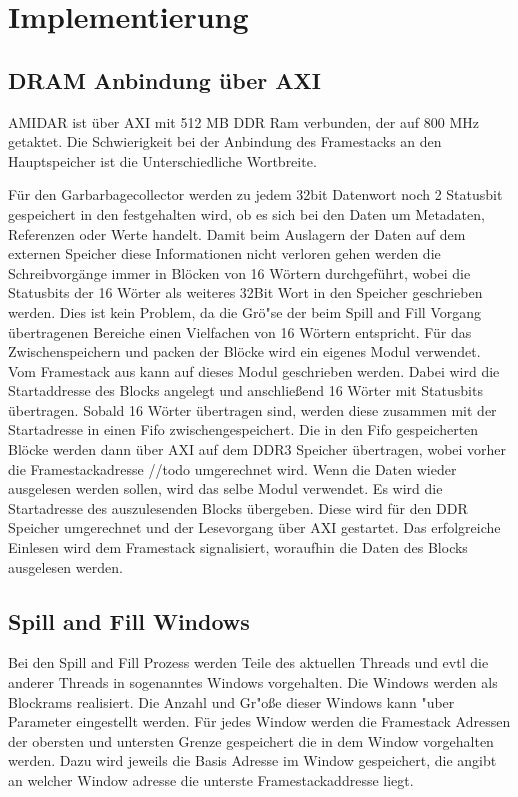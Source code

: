 \chapter{Implementierung}
\label{cha:Implementierung}
\section{DRAM Anbindung \"uber AXI}
AMIDAR ist \"uber AXI mit 512 MB DDR Ram verbunden, der auf 800 MHz getaktet.
Die Schwierigkeit bei der Anbindung des Framestacks an den Hauptspeicher ist die Unterschiedliche Wortbreite. 

F\"ur den Garbarbagecollector werden zu jedem 32bit Datenwort noch 2 Statusbit gespeichert in den festgehalten wird, ob es sich bei den Daten um Metadaten, Referenzen oder Werte handelt. Damit beim Auslagern der Daten auf dem externen Speicher diese Informationen nicht verloren gehen werden die Schreibvorg\"ange immer in Bl\"ocken von 16 W\"ortern durchgef\"uhrt, wobei die Statusbits der 16 W\"orter als weiteres 32Bit Wort in den Speicher geschrieben werden. Dies ist kein Problem, da die Gr\"o"se der beim Spill and Fill Vorgang \"ubertragenen Bereiche einen Vielfachen von 16 W\"ortern entspricht. 
F\"ur das Zwischenspeichern und packen der Bl\"ocke wird ein eigenes Modul verwendet.
Vom Framestack aus kann auf dieses Modul geschrieben werden. Dabei wird die Startaddresse des Blocks angelegt und anschließend 16 W\"orter mit Statusbits \"ubertragen. Sobald 16 W\"orter \"ubertragen sind, werden diese zusammen mit der Startadresse in einen Fifo zwischengespeichert. Die in den Fifo gespeicherten Bl\"ocke werden dann \"uber AXI auf dem DDR3 Speicher \"ubertragen, wobei vorher die Framestackadresse //todo umgerechnet wird. 
Wenn die Daten wieder ausgelesen werden sollen, wird das selbe Modul verwendet. Es wird die Startadresse des auszulesenden Blocks \"ubergeben. Diese wird f\"ur den DDR Speicher umgerechnet und der Lesevorgang \"uber AXI gestartet. Das erfolgreiche Einlesen wird dem Framestack signalisiert, woraufhin die Daten des Blocks ausgelesen werden. 

\section{Spill and Fill Windows}

Bei den Spill and Fill Prozess werden Teile des aktuellen Threads  und evtl die anderer Threads in sogenanntes Windows vorgehalten. Die Windows werden als Blockrams realisiert. 
Die Anzahl und Gr"oße dieser Windows kann "uber Parameter eingestellt werden. Für jedes Window werden die Framestack Adressen der obersten und untersten Grenze gespeichert die in dem Window vorgehalten werden. Dazu wird jeweils die Basis Adresse im Window gespeichert, die angibt an welcher Window adresse die unterste Framestackaddresse liegt. 


